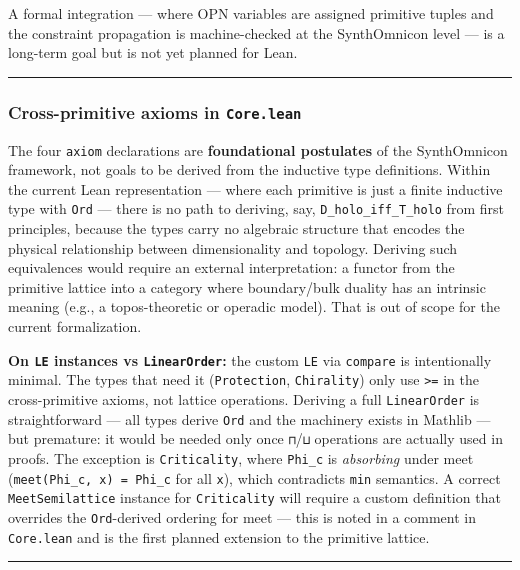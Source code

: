 \documentclass[11pt,a4paper]{article}
\begin{document}
A formal integration --- where OPN variables are assigned primitive tuples and the constraint
propagation is machine-checked at the SynthOmnicon level --- is a long-term goal but is not yet
planned for Lean.

\begin{center}
\rule{0.5\textwidth}{0.4pt}
\end{center}

\subsubsection{Cross-primitive axioms in \texttt{Core.lean}}

The four \texttt{axiom} declarations are \textbf{foundational postulates} of the SynthOmnicon framework,
not goals to be derived from the inductive type definitions. Within the current Lean
representation --- where each primitive is just a finite inductive type with \texttt{Ord} --- there is
no path to deriving, say, \texttt{D\_holo\_iff\_T\_holo} from first principles, because the types carry
no algebraic structure that encodes the physical relationship between dimensionality and topology.
Deriving such equivalences would require an external interpretation: a functor from the primitive
lattice into a category where boundary/bulk duality has an intrinsic meaning (e.g., a
topos-theoretic or operadic model). That is out of scope for the current formalization.

\textbf{On \texttt{LE} instances vs \texttt{LinearOrder}:} the custom \texttt{LE} via \texttt{compare} is intentionally minimal.
The types that need it (\texttt{Protection}, \texttt{Chirality}) only use \texttt{\textgreater{}=} in the cross-primitive axioms,
not lattice operations. Deriving a full \texttt{LinearOrder} is straightforward --- all types derive \texttt{Ord}
and the machinery exists in Mathlib --- but premature: it would be needed only once \texttt{⊓}/\texttt{⊔}
operations are actually used in proofs. The exception is \texttt{Criticality}, where \texttt{Phi\_c} is
\emph{absorbing} under meet (\texttt{meet(Phi\_c, x) = Phi\_c} for all \texttt{x}), which contradicts \texttt{min} semantics.
A correct \texttt{MeetSemilattice} instance for \texttt{Criticality} will require a custom definition that
overrides the \texttt{Ord}-derived ordering for meet --- this is noted in a comment in \texttt{Core.lean} and
is the first planned extension to the primitive lattice.

\begin{center}
\rule{0.5\textwidth}{0.4pt}
\end{center}
\end{document}
